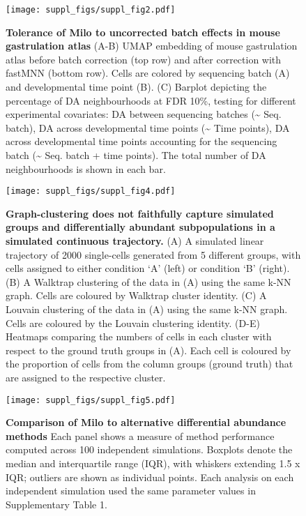 \documentclass[
]{article}
\begin{document}
\begin{figure}
\centering
\texttt{[image: suppl\_figs/suppl\_fig2.pdf]}
\caption{\label{fig:sup-fig-2}\textbf{Tolerance of Milo to uncorrected batch effects in mouse gastrulation atlas}
(A-B) UMAP embedding of mouse gastrulation atlas before batch correction (top row) and after correction with fastMNN (bottom row). Cells are colored by sequencing batch (A) and developmental time point (B).
(C) Barplot depicting the percentage of DA neighbourhoods at FDR 10\%, testing for different experimental covariates: DA between sequencing batches (\textasciitilde{} Seq. batch), DA across developmental time points (\textasciitilde{} Time points), DA across developmental time points accounting for the sequencing batch (\textasciitilde{} Seq. batch + time points). The total number of DA neighbourhoods is shown in each bar.}
\end{figure}





\begin{figure}
\centering
\texttt{[image: suppl\_figs/suppl\_fig4.pdf]}
\caption{\label{fig:sup-fig-4}\textbf{Graph-clustering does not faithfully capture simulated groups and differentially abundant subpopulations in a simulated continuous trajectory.}
(A) A simulated linear trajectory of 2000 single-cells generated from 5 different groups, with cells assigned to either condition `A' (left) or condition `B' (right).
(B) A Walktrap clustering of the data in (A) using the same k-NN graph. Cells are coloured by Walktrap cluster identity.
(C) A Louvain clustering of the data in (A) using the same k-NN graph. Cells are coloured by the Louvain clustering identity.
(D-E) Heatmaps comparing the numbers of cells in each cluster with respect to the ground truth groups in (A). Each cell is coloured by the proportion of cells from the column groups (ground truth) that are assigned to the respective cluster.}
\end{figure}







\begin{figure}
\centering
\texttt{[image: suppl\_figs/suppl\_fig5.pdf]}
\caption{\label{fig:sup-fig-5}\textbf{Comparison of Milo to alternative differential abundance methods}
Each panel shows a measure of method performance computed across 100 independent simulations. Boxplots denote the median and interquartile range (IQR), with whiskers extending 1.5 x IQR; outliers are shown as individual points. Each analysis on each independent simulation used the same parameter values in Supplementary Table 1.}
\end{figure}
\end{document}
